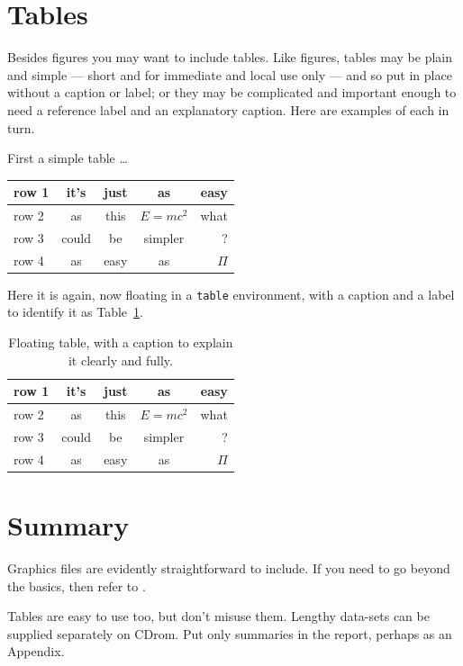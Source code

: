 \section{Tables}\label{sec:tables}
Besides figures you may want to include tables. Like figures, tables may
be plain and simple --- short and for immediate and local use only ---
and so put in place without a caption or label; or they may be
complicated and important enough to need a reference label and an
explanatory caption. Here are examples of each in turn.
\par
First a simple table \dots
\par
\begin{center}
 \begin{tabular}{|l||c|c|c|r|}
    \hline
    row 1& it's & just & as & easy \\ \hline
    row 2& as & this & \(E=mc^2\) & what \\ \hline
    row 3& could & be & simpler & ? \\ \hline
    row 4& as & easy & as & \(\Pi\) \\ \hline
  \end{tabular}
\end{center}
\par
Here it is again, now floating in a \texttt{table} environment, with
a caption and a label to identify it as Table~\ref{table:one}.
\begin{table}[h]
  \centering
\begin{tabular}{|l||c|c|c|r|}
    \hline
    row 1& it's & just & as & easy \\ \hline
    row 2& as & this & \(E=mc^2\) & what \\ \hline
    row 3& could & be & simpler & ? \\ \hline
    row 4& as & easy & as & \(\Pi\) \\ \hline
  \end{tabular}
  \caption{Floating table, with a caption to explain it
clearly and fully.}\label{table:one}
\end{table}
\section{Summary}
Graphics files are evidently straightforward to include. If you need
to go beyond the basics, then refer to 
\cite{GRM}.
\par
Tables are easy to use too, but don't misuse them. Lengthy data-sets can
be supplied separately on CDrom. Put only summaries in the report,
perhaps as an Appendix.
